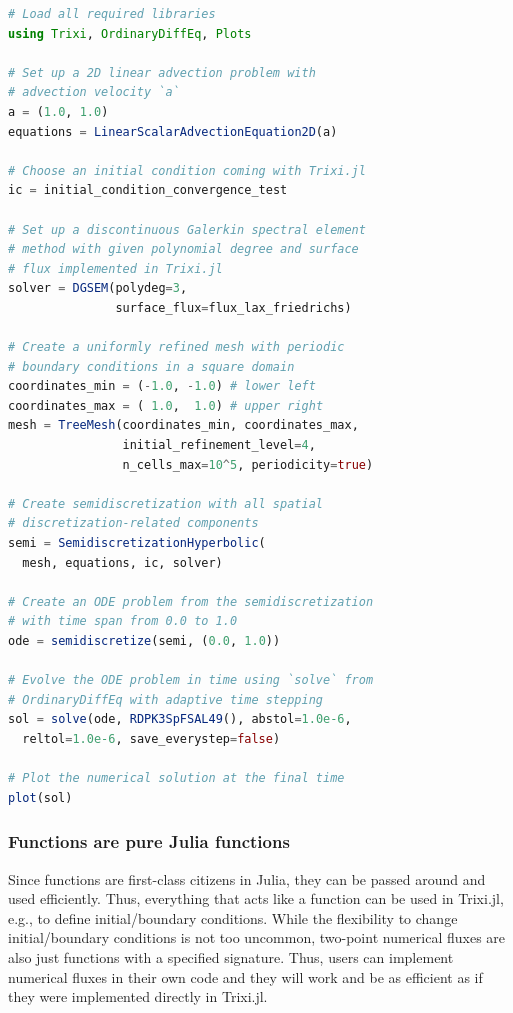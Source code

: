 \documentclass{juliacon}
\makeatletter
\newcommand{\eg}[0]{{e.g.\@}\xspace}
\newcommand{\trixi}{Trixi.jl\xspace}
\makeatother
\begin{document}
\begin{lstlisting}[language = Julia]
# Load all required libraries
using Trixi, OrdinaryDiffEq, Plots

# Set up a 2D linear advection problem with
# advection velocity `a`
a = (1.0, 1.0)
equations = LinearScalarAdvectionEquation2D(a)

# Choose an initial condition coming with Trixi.jl
ic = initial_condition_convergence_test

# Set up a discontinuous Galerkin spectral element
# method with given polynomial degree and surface
# flux implemented in Trixi.jl
solver = DGSEM(polydeg=3,
               surface_flux=flux_lax_friedrichs)

# Create a uniformly refined mesh with periodic
# boundary conditions in a square domain
coordinates_min = (-1.0, -1.0) # lower left
coordinates_max = ( 1.0,  1.0) # upper right
mesh = TreeMesh(coordinates_min, coordinates_max,
                initial_refinement_level=4,
                n_cells_max=10^5, periodicity=true)

# Create semidiscretization with all spatial
# discretization-related components
semi = SemidiscretizationHyperbolic(
  mesh, equations, ic, solver)

# Create an ODE problem from the semidiscretization
# with time span from 0.0 to 1.0
ode = semidiscretize(semi, (0.0, 1.0))

# Evolve the ODE problem in time using `solve` from
# OrdinaryDiffEq with adaptive time stepping
sol = solve(ode, RDPK3SpFSAL49(), abstol=1.0e-6,
  reltol=1.0e-6, save_everystep=false)

# Plot the numerical solution at the final time
plot(sol)
\end{lstlisting}

\subsubsection{Functions are pure Julia functions}

Since functions are first-class citizens in Julia, they can be passed around
and used efficiently. Thus, everything that acts like a function can be used
in \trixi, \eg, to define initial/boundary conditions. While the flexibility
to change initial/boundary conditions
is not too uncommon, two-point numerical fluxes are also just functions with a
specified signature. Thus, users can implement numerical fluxes in their
own code and they will work and be as efficient as if they were implemented
directly in \trixi.
\end{document}
